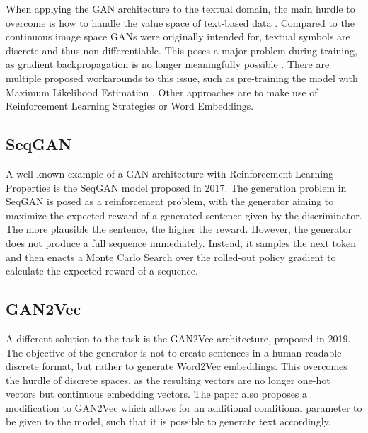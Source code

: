 \documentclass[../main]{subfiles}
\begin{document}
When applying the GAN architecture to the textual domain, the main hurdle to overcome is how to handle the value space of text-based data  \cite{tevet2018evaluating}.  Compared to the continuous image space GANs were originally intended for,  textual symbols are discrete and thus non-differentiable. This poses a major problem during training, as gradient backpropagation is no longer meaningfully possible \cite{gan2vec}. There are multiple proposed workarounds to this issue, such as pre-training the model with Maximum Likelihood Estimation \cite{shang-etal-2015-neural}.  Other approaches are to make use of Reinforcement Learning Strategies or Word Embeddings.

\subsection{SeqGAN \cite{seqgan}}
A well-known example of a GAN architecture with Reinforcement Learning Properties is the SeqGAN model proposed in 2017.  The generation problem in SeqGAN is posed as a reinforcement problem, with the generator aiming to maximize the expected reward of a generated sentence given by the discriminator.  The more plausible the sentence, the higher the reward. However, the generator does not produce a full sequence immediately. Instead, it samples the next token and then enacts a Monte Carlo Search over the rolled-out policy gradient to calculate the expected reward of a sequence. \cite{Wang2019}

\subsection{GAN2Vec \cite{gan2vec}}
A different solution to the task is the GAN2Vec architecture, proposed in 2019.  The objective of the generator is not to create sentences in a human-readable discrete format, but rather to generate Word2Vec embeddings. This overcomes the hurdle of discrete spaces, as the resulting vectors are no longer one-hot vectors but continuous embedding vectors.  The paper also proposes a modification to GAN2Vec which allows for an additional conditional parameter to be given to the model, such that it is possible to generate text accordingly.
\end{document}
